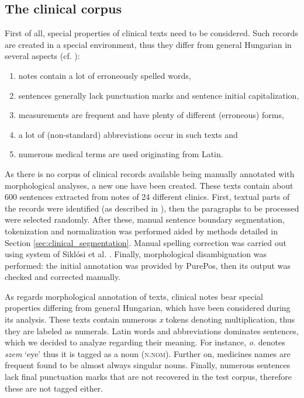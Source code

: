 \subsection{The clinical corpus}

First of all, special properties of clinical texts need to be considered. 
Such records are created in a special environment, thus they differ from general Hungarian in several aspects (cf. \cite{Orosz2013a,Siklosi2013b,Siklosi2012}):

\begin{enumerate} %
 \item notes contain a lot of erroneously spelled words,
 \item sentences generally lack punctuation marks and sentence initial capitalization, 
 \item measurements are frequent and have plenty of different (erroneous) forms,
 \item a lot of (non-standard) abbreviations occur in such texts and
 \item numerous medical terms are used originating from Latin.
\end{enumerate}

As there is no corpus of clinical records available being manually annotated with morphological analyses, a new one have been created. 
These texts contain about 600 sentences extracted from notes of 24 different clinics. 
First, textual parts of the records were identified (as described in \cite{Siklosi2012}), then the paragraphs to be processed were selected randomly. 
After these, manual sentence boundary segmentation, tokenization and normalization was performed aided by methods detailed in Section \ref{sec:clinical_segmentation}. 
Manual spelling correction was carried out using system of Siklósi et al. \cite{Siklosi2013}. 
Finally, morphological disambiguation was performed: the initial annotation was provided by PurePos, then its output was checked and corrected manually. 

As regards morphological annotation of texts, clinical notes bear special properties differing from general Hungarian, which have been considered during its analysis. 
These texts contain numerous \textit{x} tokens denoting multiplication, thus they are labeled as numerals. 
Latin words and abbreviations dominates sentences, which we decided to analyze regarding their meaning. 
For instance, \textit{o.} denotes \textit{szem} `eye’ thus it is tagged as a noun (\textsc{n.nom}). 
Further on, medicines names are frequent found to be almost always singular nouns. 
Finally, numerous sentences lack final punctuation marks that are not recovered in the test corpus, therefore these are not tagged either. 

